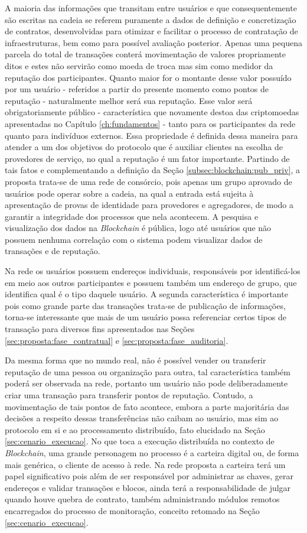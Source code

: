 %
A maioria das informações que transitam entre usuários e que consequentemente são escritas na cadeia se referem puramente a dados de definição e concretização de contratos, desenvolvidas para otimizar e facilitar o processo de contratação de infraestruturas, bem como para possível avaliação posterior.
%
Apenas uma pequena parcela do total de transações conterá movimentação de valores propriamente ditos e estes não servirão como moeda de troca mas sim como medidor da reputação dos participantes. Quanto maior for o montante desse valor possuído por um usuário - referidos a partir do presente momento como pontos de reputação - naturalmente melhor será sua reputação. Esse valor será obrigatoriamente público - característica que novamente destoa das criptomoedas apresentadas no Capítulo \ref{ch:fundamentos} - tanto para os participantes da rede quanto para indivíduos externos. Essa propriedade é definida dessa maneira para atender a um dos objetivos do protocolo que é auxiliar clientes na escolha de provedores de serviço, no qual a reputação é um fator importante. Partindo de tais fatos e complementando a definição da Seção \ref{subsec:blockchain:pub_priv}, a proposta trata-se de uma rede de consórcio, pois apenas um grupo aprovado de usuários pode operar sobre a cadeia, na qual a entrada está sujeita à apresentação de provas de identidade para provedores e agregadores, de modo a garantir a integridade dos processos que nela acontecem. A pesquisa e visualização dos dados na \textit{Blockchain} é pública, logo até usuários que não possuem nenhuma correlação com o sistema podem visualizar dados de transações e de reputação.

%
Na rede os usuários possuem endereços individuais, responsáveis por identificá-los em meio aos outros participantes e possuem também um endereço de grupo, que identifica qual é o tipo daquele usuário. A segunda característica é importante pois como grande parte das transações trata-se de publicação de informações, torna-se interessante que mais de um usuário possa referenciar certos tipos de transação para diversos fins apresentados nas Seções \ref{sec:proposta:fase_contratual} e \ref{sec:proposta:fase_auditoria}.

%
Da mesma forma que no mundo real, não é possível vender ou transferir reputação de uma pessoa ou organização para outra, tal característica também poderá ser observada na rede, portanto um usuário não pode deliberadamente criar uma transação para transferir pontos de reputação. Contudo, a movimentação de tais pontos de fato acontece, embora a parte majoritária das decisões a respeito dessas transferências não caibam ao usuário, mas sim ao protocolo em si e ao processamento distribuído, fato elucidado na Seção \ref{sec:cenario_execucao}. No que toca a execução distribuída no contexto de \textit{Blockchain}, uma grande personagem no processo é a carteira digital ou, de forma mais genérica, o cliente de acesso à rede. Na rede proposta a carteira terá um papel significativo pois além de ser responsável por administrar as chaves, gerar endereços e validar transações e blocos, ainda terá a responsabilidade de julgar quando houve quebra de contrato, também administrando módulos remotos encarregados do processo de monitoração, conceito retomado na Seção \ref{sec:cenario_execucao}.

